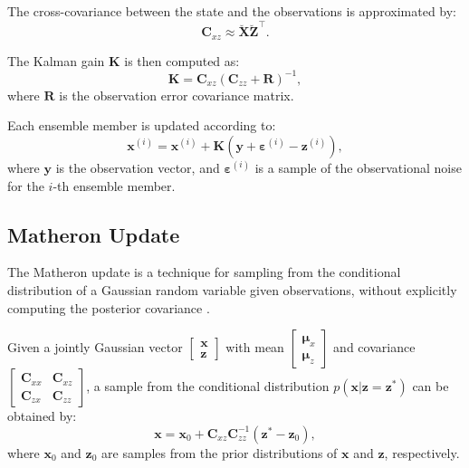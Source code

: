 \documentclass{article}
\theoremstyle{plain}
\begin{document}
The cross-covariance between the state and the observations is approximated by:
\begin{equation}
    \mathbf{C}_{xz} \approx \breve{\mathbf{X}} \breve{\mathbf{Z}}^\top.
\end{equation}

The Kalman gain $\mathbf{K}$ is then computed as:
\begin{equation}
    \mathbf{K} = \mathbf{C}_{xz} \left( \mathbf{C}_{zz} + \mathbf{R} \right)^{-1},
    \label{eq:kalman_gain}
\end{equation}
where $\mathbf{R}$ is the observation error covariance matrix.

Each ensemble member is updated according to:
\begin{equation}
    \mathbf{x}^{(i)} = \mathbf{x}^{(i)} + \mathbf{K} \left( \mathbf{y} + \boldsymbol{\varepsilon}^{(i)} - \mathbf{z}^{(i)} \right),
    \label{eq:enkf_update}
\end{equation}
where $\mathbf{y}$ is the observation vector, and $\boldsymbol{\varepsilon}^{(i)}$ is a sample of the observational noise for the $i$-th ensemble member.

\subsection{Matheron Update}

The Matheron update is a technique for sampling from the conditional distribution of a Gaussian random variable given observations, without explicitly computing the posterior covariance \citep{Doucet2010Note,Wilson2020Efficiently,Wilson2021Pathwise}.

Given a jointly Gaussian vector $\begin{bmatrix} \mathbf{x} \\ \mathbf{z} \end{bmatrix}$ with mean $\begin{bmatrix} \boldsymbol{\mu}_x \\ \boldsymbol{\mu}_z \end{bmatrix}$ and covariance $\begin{bmatrix} \mathbf{C}_{xx} & \mathbf{C}_{xz} \\ \mathbf{C}_{zx} & \mathbf{C}_{zz} \end{bmatrix}$, a sample from the conditional distribution $p(\mathbf{x} | \mathbf{z} = \mathbf{z}^*)$ can be obtained by:
\begin{equation}
    \mathbf{x} = \mathbf{x}_0 + \mathbf{C}_{xz} \mathbf{C}_{zz}^{-1} \left( \mathbf{z}^* - \mathbf{z}_0 \right),
    \label{eq:matheron_update}
\end{equation}
where $\mathbf{x}_0$ and $\mathbf{z}_0$ are samples from the prior distributions of $\mathbf{x}$ and $\mathbf{z}$, respectively.
\end{document}

